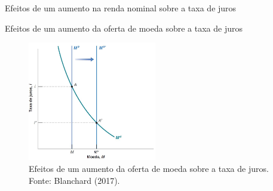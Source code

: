 \documentclass[10pt]{beamer}
\begin{document}
\begin{frame}{Efeitos de um aumento na renda nominal sobre a taxa de juros}

\begin{frame}{Efeitos de um aumento da oferta de moeda sobre a taxa de juros}
    \begin{figure}
        \centering
        \includegraphics[width=0.5\textwidth]{./figures/aula072_fig4.JPG}
        \caption{Efeitos de um aumento da oferta de moeda sobre a taxa de juros. Fonte: Blanchard (2017).}
        \label{fig4}
    \end{figure}
\end{frame}


\end{frame}
\end{document}
